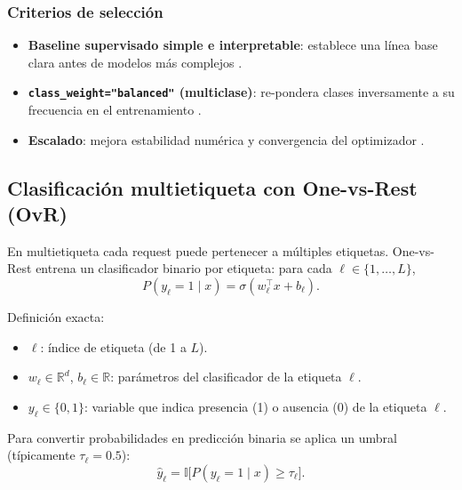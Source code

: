 \documentclass[12pt,oneside]{report}
\newcommand{\R}{\mathbb{R}}
\newcommand{\sigmoid}{\sigma}
\newcommand{\ind}{\mathbb{I}} %
\begin{document}
\subsubsection{Criterios de selección}
\begin{itemize}[leftmargin=*]
  \item \textbf{Baseline supervisado simple e interpretable}: establece una línea base clara antes de modelos más complejos \cite{islr_logreg}.
  \item \textbf{\texttt{class\_weight="balanced"} (multiclase)}: re-pondera clases inversamente a su frecuencia en el entrenamiento \cite{sklearn_logreg}.
  \item \textbf{Escalado}: mejora estabilidad numérica y convergencia del optimizador \cite{sklearn_logreg}.
\end{itemize}

\subsection{Clasificación multietiqueta con One-vs-Rest (OvR)}
En multietiqueta cada request puede pertenecer a múltiples etiquetas. One-vs-Rest entrena un clasificador binario por etiqueta:
para cada $\ell \in \{1,\dots,L\}$,
\[
P(y_\ell=1\mid x)=\sigmoid(w_\ell^\top x + b_\ell).
\]

Definición exacta:
\begin{itemize}[leftmargin=*]
  \item $\ell$: índice de etiqueta (de 1 a $L$).
  \item $w_\ell \in \R^d$, $b_\ell \in \R$: parámetros del clasificador de la etiqueta $\ell$.
  \item $y_\ell \in \{0,1\}$: variable que indica presencia (1) o ausencia (0) de la etiqueta $\ell$.
\end{itemize}

Para convertir probabilidades en predicción binaria se aplica un umbral (típicamente $\tau_\ell=0.5$):
\[
\hat{y}_{\ell} = \ind\big[P(y_\ell=1\mid x)\ge \tau_\ell\big].
\]
\end{document}
